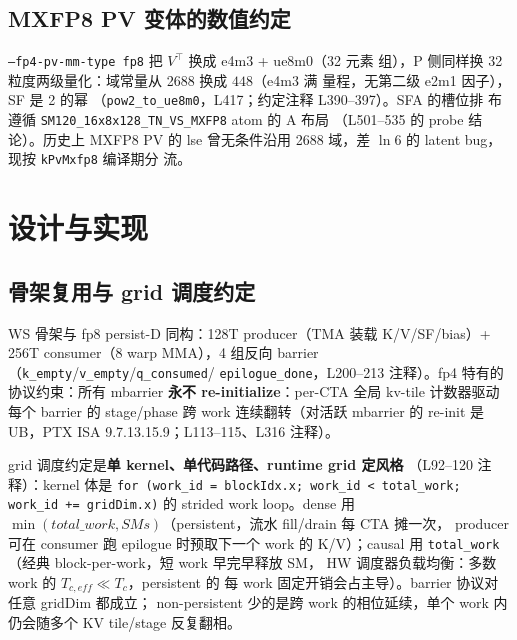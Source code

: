 \subsection{MXFP8 PV 变体的数值约定}

\texttt{--fp4-pv-mm-type fp8} 把 $V^\top$ 换成 e4m3 + ue8m0（32 元素
组），P 侧同样换 32 粒度两级量化：域常量从 2688 换成 $448$（e4m3 满
量程，无第二级 e2m1 因子），SF 是 2 的幂
（\texttt{pow2\_to\_ue8m0}，L417；约定注释 L390--397）。SFA 的槽位排
布遵循 \texttt{SM120\_16x8x128\_TN\_VS\_MXFP8} atom 的 A 布局
（L501--535 的 probe 结论）。历史上 MXFP8 PV 的 lse 曾无条件沿用
2688 域，差 $\ln 6$ 的 latent bug，现按 \texttt{kPvMxfp8} 编译期分
流。

\section{设计与实现}

\subsection{骨架复用与 grid 调度约定}

WS 骨架与 fp8 persist-D 同构：128T producer（TMA 装载 K/V/SF/bias）+
256T consumer（8 warp MMA），4 组反向 barrier
（\texttt{k\_empty}/\texttt{v\_empty}/\texttt{q\_consumed}/
\texttt{epilogue\_done}，L200--213 注释）。fp4 特有的协议约束：所有
mbarrier \textbf{永不 re-initialize}：per-CTA 全局 kv-tile 计数器驱动
每个 barrier 的 stage/phase 跨 work 连续翻转（对活跃 mbarrier 的
re-init 是 UB，PTX ISA 9.7.13.15.9；L113--115、L316 注释）。

grid 调度约定是\textbf{单 kernel、单代码路径、runtime grid 定风格}
（L92--120 注释）：kernel 体是
\texttt{for (work\_id = blockIdx.x; work\_id < total\_work; work\_id +=
gridDim.x)} 的 strided work loop。dense 用
$\min(total\_work, SMs)$（persistent，流水 fill/drain 每 CTA 摊一次，
producer 可在 consumer 跑 epilogue 时预取下一个 work 的 K/V）；causal
用 \texttt{total\_work}（经典 block-per-work，短 work 早完早释放 SM，
HW 调度器负载均衡：多数 work 的 $T_{c,eff}\ll T_c$，persistent 的
每 work 固定开销会占主导）。barrier 协议对任意 gridDim 都成立；
non-persistent 少的是跨 work 的相位延续，单个 work 内仍会随多个 KV tile/stage 反复翻相。

